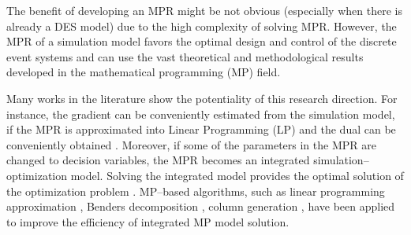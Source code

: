 \documentclass[]{interact}
\theoremstyle{plain}%
\theoremstyle{definition}
\theoremstyle{remark}
\begin{document}
The benefit of developing an MPR might be not obvious (especially when there is already a DES model) due to the high complexity of solving MPR. 
However, the MPR of a simulation model favors the optimal design and control of the discrete event systems and can use %
the vast theoretical and methodological results developed in the mathematical programming (MP) field. 

Many works in the literature show the potentiality of this research direction. For instance, the gradient can be conveniently estimated from the simulation model, if the MPR is approximated into Linear Programming (LP) and %
the dual can be conveniently obtained \citep{chan2008optimization, zhang2020simulation}. Moreover, if some of the parameters in the MPR are changed to decision variables, the MPR becomes an integrated simulation--optimization model. Solving the integrated model provides the optimal solution of the optimization problem \citep{matta2008simulation}. MP--based algorithms, such as linear programming approximation \citep{alfieri2012mathematical}, Benders decomposition \citep{weiss2015buffer}, column generation \citep{alfieri2020time}, have been applied to improve the efficiency of %
integrated MP model solution. 
\end{document}
